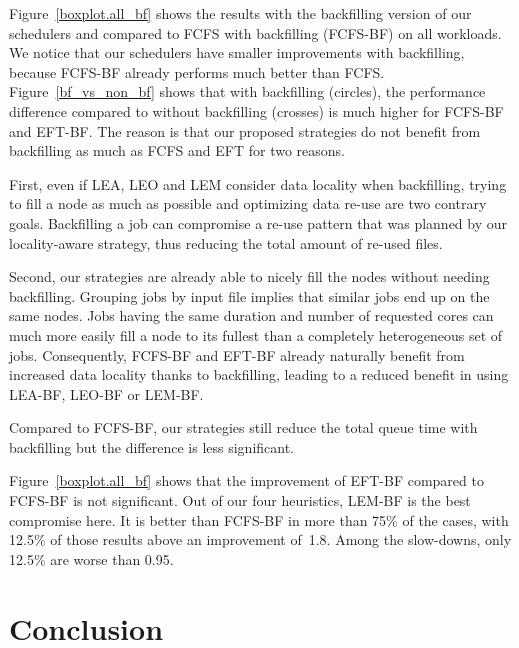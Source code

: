 \documentclass[conference]{IEEEtran}
\begin{document}
Figure~\ref{boxplot.all_bf} shows the results with the backfilling version of our
schedulers and compared to FCFS with backfilling (FCFS-BF) on all workloads.
We notice that our schedulers have smaller improvements with
backfilling, because FCFS-BF already performs much better than FCFS.
Figure~\ref{bf_vs_non_bf} shows that with backfilling (circles), the performance difference compared to without backfilling (crosses) is much higher for FCFS-BF and EFT-BF.
The reason is that our proposed strategies do not benefit from backfilling as much as FCFS and EFT for two reasons.

First, even if LEA, LEO and LEM consider data locality when backfilling, trying to fill a node as much as possible and optimizing data re-use are two contrary goals. 
Backfilling a job can compromise a re-use pattern that was planned by our locality-aware strategy,
thus reducing the total amount of re-used files.

Second, our strategies are already able to nicely fill the nodes without needing backfilling.
Grouping jobs by input file implies that similar jobs end up on the same nodes.
Jobs having the same duration and number of requested cores can much more easily fill a node to its fullest than a completely heterogeneous set of jobs.
Consequently, FCFS-BF and EFT-BF already naturally benefit from increased data locality thanks to backfilling, leading to a reduced benefit in using LEA-BF, LEO-BF or LEM-BF.

Compared to FCFS-BF, our strategies still reduce the total queue time with backfilling but the difference is less significant.

Figure~\ref{boxplot.all_bf} shows that the improvement of EFT-BF compared to FCFS-BF is not significant.
Out of our four heuristics, LEM-BF is the best compromise here.
It is better than FCFS-BF in more than 75\% of the cases, 
with 12.5\% of those results above an improvement of~1.8.
Among the slow-downs, only 12.5\% are worse than 0.95.

\section{Conclusion}\label{sec.conclusion}
\end{document}
